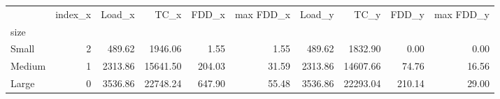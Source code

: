 \begin{tabular}{lrrrrrrrrr}
\toprule
{} &  index\_x &   Load\_x &      TC\_x &   FDD\_x &  max FDD\_x &   Load\_y &      TC\_y &   FDD\_y &  max FDD\_y \\
size   &          &          &           &         &            &          &           &         &            \\
\midrule
Small  &        2 &   489.62 &   1946.06 &    1.55 &       1.55 &   489.62 &   1832.90 &    0.00 &       0.00 \\
Medium &        1 &  2313.86 &  15641.50 &  204.03 &      31.59 &  2313.86 &  14607.66 &   74.76 &      16.56 \\
Large  &        0 &  3536.86 &  22748.24 &  647.90 &      55.48 &  3536.86 &  22293.04 &  210.14 &      29.00 \\
\bottomrule
\end{tabular}
